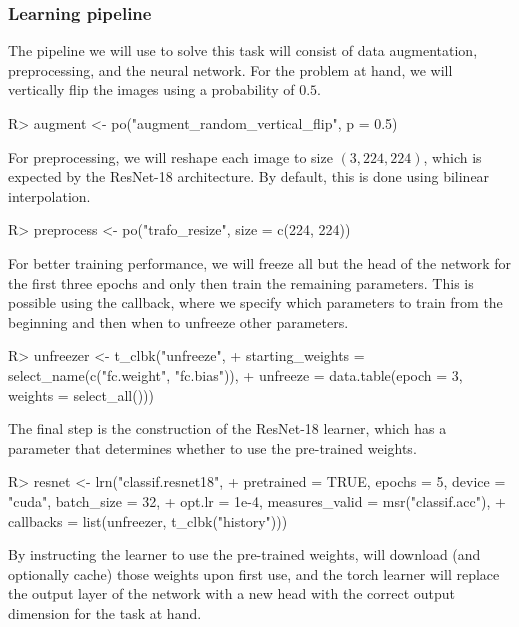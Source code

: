 \documentclass[article]{jss}
\theoremstyle{definition}
\begin{document}
\subsubsection{Learning pipeline}

The pipeline we will use to solve this task will consist of data augmentation, preprocessing, and the neural network.
For the problem at hand, we will vertically flip the images using a probability of $0.5$.

\begin{CodeInput}
R> augment <- po("augment_random_vertical_flip", p = 0.5)
\end{CodeInput}

For preprocessing, we will reshape each image to size $(3, 224, 224)$, which is expected by the ResNet-18 architecture.
By default, this is done using bilinear interpolation.

\begin{CodeInput}
R> preprocess <- po("trafo_resize", size = c(224, 224))
\end{CodeInput}

For better training performance, we will freeze all but the head of the network for the first three epochs and only then train the remaining parameters.
This is possible using the  callback, where we specify which parameters to train from the beginning and then when to unfreeze other parameters.

\begin{CodeInput}
R> unfreezer <- t_clbk("unfreeze",
+    starting_weights = select_name(c("fc.weight", "fc.bias")),
+    unfreeze = data.table(epoch = 3, weights = select_all()))
\end{CodeInput}

The final step is the construction of the ResNet-18 learner, which has a parameter  that determines whether to use the pre-trained weights.

\begin{CodeInput}
R> resnet <- lrn("classif.resnet18",
+    pretrained = TRUE, epochs = 5, device = "cuda", batch_size = 32,
+    opt.lr = 1e-4, measures_valid = msr("classif.acc"),
+    callbacks = list(unfreezer, t_clbk("history")))
\end{CodeInput}

By instructing the learner to use the pre-trained weights,  will download (and optionally cache) those weights upon first use, and the torch learner will replace the output layer of the network with a new head with the correct output dimension for the task at hand.
\end{document}
